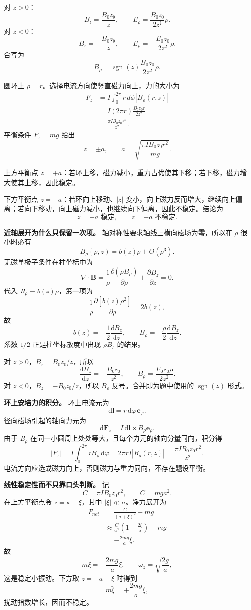 \documentclass[12pt,a4paper,UTF8]{ctexart}
\begin{document}
对 \(z>0\)： \[
B_z=\frac{B_0z_0}{z},
\qquad
B_\rho=\frac{B_0z_0}{2z^2}\rho. \tag{4}
\] 对 \(z<0\)： \[
B_z=-\frac{B_0z_0}{z},
\qquad
B_\rho=-\frac{B_0z_0}{2z^2}\rho. \tag{5}
\] 合写为 \[
\boxed{B_\rho=\operatorname{sgn}(z)
\frac{B_0z_0}{2z^2}\rho}. \tag{6}
\]

圆环上 \(\rho=r\)。选择电流方向使竖直磁力向上，力的大小为 \[
\begin{aligned}
F_z
&=I\int_0^{2\pi}r\,d\phi\,|B_\rho(r,z)|\\
&=I(2\pi r)\frac{B_0z_0r}{2z^2}\\
&=\frac{\pi I B_0z_0r^2}{z^2}.
\end{aligned} \tag{7}
\] 平衡条件 \(F_z=mg\) 给出 \[
\boxed{z=\pm a},
\qquad
\boxed{a=\sqrt{\frac{\pi I B_0z_0r^2}{mg}}}. \tag{8}
\]

上方平衡点
\(z=+a\)：若环上移，磁力减小，重力占优使其下移；若下移，磁力增大使其上移，因此稳定。

下方平衡点 \(z=-a\)：若环向上移动、\(|z|\)
变小，向上磁力反而增大，继续向上偏离；若向下移动，向上磁力减小，也继续向下偏离，因此不稳定。结论为
\[
\boxed{z=+a\text{ 稳定},\qquad z=-a\text{ 不稳定}}. \tag{9}
\]

\textbf{近轴展开为什么只保留一次项。}
轴对称性要求轴线上横向磁场为零，所以在 \(\rho\) 很小时必有 \[
B_\rho(\rho,z)=b(z)\rho+O(\rho^3).
\] 无磁单极子条件在柱坐标中为 \[
\nabla\cdot\boldsymbol B
=\frac1\rho\frac{\partial(\rho B_\rho)}{\partial\rho}
+\frac{\partial B_z}{\partial z}=0.
\] 代入 \(B_\rho=b(z)\rho\)，第一项为 \[
\frac1\rho\frac{\partial[b(z)\rho^2]}{\partial\rho}=2b(z),
\] 故 \[
b(z)=-\frac12\frac{\mathrm dB_z}{\mathrm dz},
\qquad
B_\rho=-\frac\rho2\frac{\mathrm dB_z}{\mathrm dz}.
\] 系数 \(1/2\) 正是柱坐标散度中出现 \(\rho B_\rho\) 的结果。

对 \(z>0\)，\(B_z=B_0z_0/z\)，所以 \[
\frac{\mathrm dB_z}{\mathrm dz}=-\frac{B_0z_0}{z^2},
\qquad
B_\rho=\frac{B_0z_0\rho}{2z^2}.
\] 对 \(z<0\)，\(B_z=-B_0z_0/z\)，所以 \(B_\rho\)
反号。合并即为题中使用的 \(\operatorname{sgn}(z)\) 形式。

\textbf{环上安培力的积分。} 环上电流元为 \[
\mathrm d\boldsymbol l=r\,\mathrm d\varphi\,\boldsymbol e_\varphi.
\] 径向磁场引起的轴向力元为 \[
\mathrm d\boldsymbol F_z
=I\,\mathrm d\boldsymbol l\times B_\rho\boldsymbol e_\rho.
\] 由于 \(B_\rho\)
在同一小圆周上处处等大，且每个力元的轴向分量同向，积分得 \[
|F_z|=I\int_0^{2\pi}rB_\rho\,\mathrm d\varphi
=2\pi rI|B_\rho(r,z)|
=\frac{\pi I B_0z_0r^2}{z^2}.
\] 电流方向应选成磁力向上，否则磁力与重力同向，不存在题设平衡。

\textbf{线性稳定性而不只靠口头判断。} 记 \[
C=\pi I B_0z_0r^2,
\qquad C=mg a^2.
\] 在上方平衡点令 \(z=a+\xi\)，其中 \(|\xi|\ll a\)。净力展开为 \[
\begin{aligned}
F_{net}
&=\frac{C}{(a+\xi)^2}-mg\\
&\approx\frac{C}{a^2}\left(1-\frac{2\xi}{a}\right)-mg\\
&=-\frac{2mg}{a}\xi.
\end{aligned}
\] 故 \[
m\ddot\xi=-\frac{2mg}{a}\xi,
\qquad
\omega_z=\sqrt{\frac{2g}{a}},
\] 这是稳定小振动。下方取 \(z=-a+\xi\) 时得到 \[
m\ddot\xi=+\frac{2mg}{a}\xi,
\] 扰动指数增长，因而不稳定。
\end{document}

